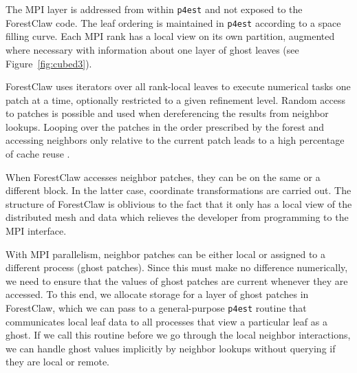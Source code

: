 \documentclass{IOS-Book-Article}     %
\newcommand{\comment}[1]{\textcolor{green}{[DAC: #1]}\xspace}
\newcommand{\cO}{\mathcal{O}}
\newcommand{\forestclaw}{ForestClaw\xspace}
\newcommand{\pforest}{\texttt{p4est}\xspace}
\newcommand{\ignore}[1]{}
\newcommand{\Fig}[1]{Figure~\ref{fig:#1}}
\newcommand{\alert}[1]{{\color{red}#1}}
\begin{document}
The MPI layer is addressed from within \pforest and not exposed to the
\forestclaw code.  The \ignore{order of leaves} leaf ordering
is maintained in \pforest according to a
space filling curve.  Each MPI rank has a local view on its own partition,
augmented where necessary with information about one layer of ghost leaves
(see \Fig{cubed3}).

\forestclaw uses iterators over all rank-local leaves to execute numerical
tasks one patch at a time, optionally restricted to a given refinement level.
Random access to patches is possible and used when dereferencing the results
from
neighbor lookups.  Looping over the patches in the order
prescribed by the forest
and
accessing neighbors only relative to the current patch leads to a high
percentage of cache reuse
\cite{BursteddeBurtscherGhattasEtAl09}.

When \forestclaw accesses neighbor patches, they can be on the same or a
different block.  In the latter case, coordinate transformations are carried
out.  The structure of \forestclaw is oblivious to the fact that it only has a
local view of the distributed mesh and data which relieves the developer from
programming to the MPI interface.

With MPI parallelism, neighbor patches can be either local or assigned to a
different process (ghost patches).  Since this must make no difference
numerically, we need to ensure that the values of ghost patches are current
whenever they are accessed.  To this end, we allocate storage for a layer of
ghost patches in \forestclaw, which we can pass to a general-purpose \pforest
routine that communicates local leaf data to all processes that view a
particular leaf as a ghost.  If we call this routine before we go through the
local neighbor interactions, we can handle ghost values implicitly by neighbor
lookups without querying if they are local or remote.

\end{document}
